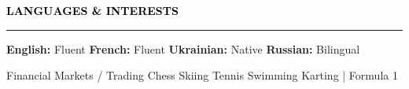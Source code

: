 \documentclass[10pt,english,french]{article}
\newcommand{\chessIcon}[1][black]{\textcolor{#1}{\faChess}}
\newcommand{\skiIcon}[1][black]{\textcolor{#1}{\faSkiing}}
\newcommand{\cryptoIcon}[1][black]{\textcolor{#1}{\faBitcoin}}
\newcommand{\swimmingIcon}[1][black]{\textcolor{#1}{\faSwimmer}}
\newcommand{\mountainsIcon}[1][black]{\textcolor{#1}{\faMountain}}
\newcommand{\speechBubbleIcon}[1][black]{\textcolor{#1}{\faComment}}
\newcommand{\tradingIcon}[1][black]{\textcolor{#1}{\faChartBar}}
\newcommand{\tennisIcon}[1][black]{\textcolor{#1}{\faBaseballBall}}
\newcommand{\flagIcon}[1][black]{\textcolor{#1}{\faFlagCheckered}}
\newlength{\mpwidth}
\newcommand{\cvsection}[1]{
    \vspace{4pt}
    \textbf{\fontsize{9pt}{10pt}\selectfont \textcolor{black}{#1}}
    \vspace{6pt}
    \hrule
    \vspace{6pt}
}
\newcommand{\cvtextnotab}[1]{
    \parbox{1\mpwidth}{#1}
}
\begin{document}
\vspace{-5pt}
\cvsection{\speechBubbleIcon[black]\hspace{4pt}LANGUAGES \& INTERESTS}

\vspace{-3pt}
\cvtextnotab{\textbf{English\!:} Fluent \hspace{12pt} \textbf{French\!:} Fluent \hspace{12pt} \textbf{Ukrainian\!:} Native \hspace{20pt} \textbf{Russian\!:} Bilingual}

\vspace{-8pt}
\cvtextnotab{
    \tradingIcon[black]\hspace{2pt}Financial Markets / Trading \hspace{12pt}
    \chessIcon[black]\hspace{2pt}Chess \hspace{12pt}
    \skiIcon[black]\hspace{2pt}Skiing \hspace{12pt}
    \tennisIcon[black]\hspace{2pt}Tennis \hspace{12pt}
    \swimmingIcon[black]\hspace{2pt}Swimming \hspace{12pt}
    \flagIcon[black]\hspace{2pt}Karting | Formula 1
}
\end{document}
